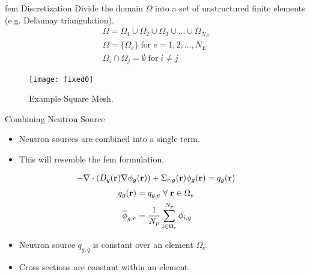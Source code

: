 \begin{frame}{\gls{fem} Discretization}
  Divide the domain $\Omega$ into a set of unstructured finite elements 
  (e.g. Delaunay triangulation).
  \begin{gather}
    \label{eq:set_of_elements}
    \Omega = \Omega_1 \cup \Omega_2 \cup \Omega_3 \cup \ldots \cup
      \Omega_{N_E}  \\
    \Omega = \{\Omega_e\} \; \text{for} \; e = 1,2,\ldots,N_E \\
    \Omega_i \cap \Omega_j = \emptyset \; \text{for} \; i \ne j
  \end{gather}
  \begin{figure}
    \centering
    \texttt{[image: fixed0]}
    \caption{Example Square Mesh.}
    \label{fig:fixed0}
  \end{figure}
\end{frame}

\begin{frame}{Combining Neutron Source}
  \begin{itemize}
    \item Neutron sources are combined into a single term.
    \item This will resemble the \gls{fem} formulation.
  \end{itemize}
  \begin{equation}
    \label{eq:multigroup_source}
    - \mathbf{\nabla} \cdot( D_g(\mathbf{r}) \mathbf{\nabla} \phi_g(\mathbf{r})) + \Sigma_{r,g}(\mathbf{r}) \phi_g(\mathbf{r}) = 
      q_g(\mathbf{r})
  \end{equation}
  \begin{align}
    q_g(\mathbf{r}) &= q_{g,e} \; \forall \; \mathbf{r} \in \Omega_e \\
    \overline{\phi}_{g,e} &= \frac{1}{N_p} \sum_{i \in \Omega_e}^{N_p} \phi_{i,g}
  \end{align}

  \begin{itemize}
    \item Neutron source $q_{g,q}$ is constant over an element $\Omega_e$.
    \item Cross sections are constant within an element.
  \end{itemize}
\end{frame}

